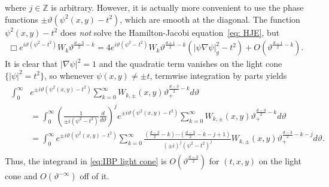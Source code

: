 \documentclass[11pt,letterpaper,oneside]{amsart}
\newcommand{\Z}{\mathbb{Z}}
\renewcommand{\theta}{\vartheta}
\theoremstyle{definition}
\theoremstyle{remark}
\theoremstyle{definition}
\theoremstyle{remark}
\begin{document}
where $j \in \Z$ is arbitrary. However, it is actually more convenient to use the phase functions $\pm \theta(\psi^2(x,y) - t^2)$, which are smooth at the diagonal. The function $\psi^2(x,y) - t^2$ does \textit{not} solve the Hamilton-Jacobi equation~\eqref{eq: HJE}, but
\begin{align}\label{eq:toporder}
    \Box e^{i \theta (\psi^2 - t^2)} W_k \theta^{\frac{d-3}{2} - k} = 4 e^{i \theta (\psi^2 - t^2)}  W_k \theta^{\frac{d+1}{2} - k} \left(|\psi \nabla \psi|_g^2 - t^2 \right) + O(\theta^{\frac{d-1}{2} - k}).
\end{align}
It is clear that $|\nabla \psi|^2 = 1$ and the quadratic term vanishes on the light cone $\{|\psi|^2 = t^2\}$, so whenever $\psi(x,y) \neq \pm t$, termwise integration by parts yields
\begin{align}\label{eq:IBP light cone}
\begin{split}
    \int_0^\infty & e^{\pm i \theta(\psi^2(x,y) - t^2)} \sum_{k = 0}^{\infty} W_{k, \pm}(x,y) \theta_+^{\frac{d-3}{2}-k} d \theta\\
    &=\int_0^\infty \left(\frac{1}{\pm i (\psi^2 - t^2)} \frac{d}{d \theta}\right)^j e^{\pm i \theta(\psi^2(x,y) - t^2)} \sum_{k = 0}^{\infty} W_{k, \pm}(x,y) \theta_+^{\frac{d-3}{2}-k} d \theta\\
    & = \int_0^\infty e^{\pm i \theta (\psi^2(x,y) - t^2)} \sum_{k = 0}^{\infty} \frac{\left(\frac{d-3}{2} - k\right) \cdots \left(\frac{d-3}{2} - k - j + 1\right)}{(\pm i)^j (\psi^2 - t^2)^j} W_{k, \pm}(x,y) \theta_+^{\frac{d-3}{2}-k -j } d \theta.
\end{split}
\end{align}
Thus, the integrand in \eqref{eq:IBP light cone} is $O(\theta^{\frac{d- 3}{2}})$ for $(t,x,y)$ on the light cone and $O(\theta^{-\infty})$ off of it.

\medskip
\end{document}
